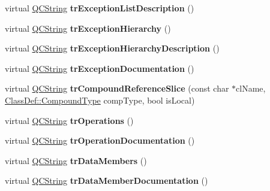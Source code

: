 \begin{DoxyCompactItemize}
virtual \mbox{\hyperlink{class_q_c_string}{Q\+C\+String}} {\bfseries tr\+Exception\+List\+Description} ()
\item 
\mbox{\label{class_translator_portuguese_aa79a0003e5e58cacf58bac4f0c8af8d7}} 
virtual \mbox{\hyperlink{class_q_c_string}{Q\+C\+String}} {\bfseries tr\+Exception\+Hierarchy} ()
\item 
\mbox{\label{class_translator_portuguese_a06967afd0936b6cbb56ac097139e09b0}} 
virtual \mbox{\hyperlink{class_q_c_string}{Q\+C\+String}} {\bfseries tr\+Exception\+Hierarchy\+Description} ()
\item 
\mbox{\label{class_translator_portuguese_af80598b8a15e85495c7214cfa6a6f307}} 
virtual \mbox{\hyperlink{class_q_c_string}{Q\+C\+String}} {\bfseries tr\+Exception\+Documentation} ()
\item 
\mbox{\label{class_translator_portuguese_a962bdc755976b0018cd9a54125f43f3b}} 
virtual \mbox{\hyperlink{class_q_c_string}{Q\+C\+String}} {\bfseries tr\+Compound\+Reference\+Slice} (const char $\ast$cl\+Name, \mbox{\hyperlink{class_class_def_ae70cf86d35fe954a94c566fbcfc87939}{Class\+Def\+::\+Compound\+Type}} comp\+Type, bool is\+Local)
\item 
\mbox{\label{class_translator_portuguese_aec9e94095a914472386a0b8a3fa63b14}} 
virtual \mbox{\hyperlink{class_q_c_string}{Q\+C\+String}} {\bfseries tr\+Operations} ()
\item 
\mbox{\label{class_translator_portuguese_a139a9e3bd18e0c0ef0cbc57cc93072d9}} 
virtual \mbox{\hyperlink{class_q_c_string}{Q\+C\+String}} {\bfseries tr\+Operation\+Documentation} ()
\item 
\mbox{\label{class_translator_portuguese_ae49f6c383b707fcf26cfa99d787da7e1}} 
virtual \mbox{\hyperlink{class_q_c_string}{Q\+C\+String}} {\bfseries tr\+Data\+Members} ()
\item 
\mbox{\label{class_translator_portuguese_ab9bd913beeedb403e77a4141f878a026}} 
virtual \mbox{\hyperlink{class_q_c_string}{Q\+C\+String}} {\bfseries tr\+Data\+Member\+Documentation} ()
\end{DoxyCompactItemize}


